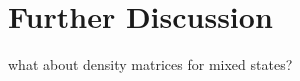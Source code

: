 
\chapter{Further Discussion} %

\label{Chapter7-further discussion} %

what about density matrices for mixed states?